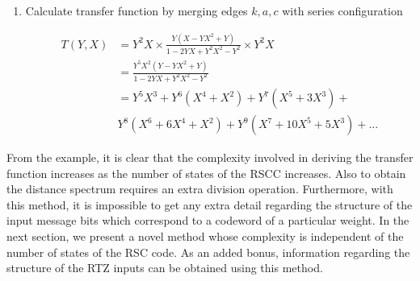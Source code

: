 \begin{example}
\begin{enumerate}
\item Calculate transfer function by merging edges $k,a,c$ with series configuration

\begin{equation*}
\begin{split}
T(Y,X)&=Y^2X \times \frac{Y(X-YX^2+Y)}{1-2YX+Y^2X^2-Y^2}\times Y^2X \\
&=\frac{Y^5X^2(Y-YX^2+Y)}{1-2YX+Y^2X^2-Y^2}\\
&=Y^5X^3+Y^6(X^4+X^2)+Y^7(X^5+3X^3)+\\
&Y^8(X^6+6X^4+X^2)+Y^9(X^7+10X^5+5X^3)+...
\end{split}
\end{equation*}
\end{enumerate}
\end{example}

From the example, it is clear that the complexity involved in deriving the transfer function increases as the number of states of the RSCC increases. Also to obtain the distance spectrum requires an extra division operation. Furthermore, with this method, it is impossible to get any extra detail regarding the structure of the input message bits which correspond to a codeword of a particular weight. In the next section, we present a novel method whose complexity is independent of the number of states of the RSC code. As an added bonus, information regarding the structure of the RTZ inputs can be obtained using this method.